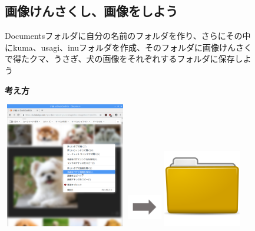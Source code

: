 \documentclass[a4paper,12pt]{jarticle}
\begin{document}
\begin{figure}[t]
  \subsection{\theExercise 
    画像けんさくし、画像をしよう}
  Documentsフォルダに自分の名前のフォルダを作り、さらにその中にkuma、usagi、inuフォルダを作成、そのフォルダに画像けんさくで得たクマ、うさぎ、犬の画像をそれぞれするフォルダに保存しよう

  \textbf{考え方}


  \bigskip




  \centering
  \begin{minipage}{\textwidth}
    \begin{minipage}{5.582cm}
      \includegraphics[width=5.413cm,height=5.461cm]{textbook-img092.png}
    \end{minipage}
    \begin{minipage}{3.582cm}
      \includegraphics[width=1.505cm,height=1.707cm]{textbook-img073.png}
    \end{minipage}
    \begin{minipage}{5.582cm}
      \includegraphics[width=3.387cm,height=3.387cm]{textbook-img044.png}
    \end{minipage}
  \end{minipage}



\end{figure}
\end{document}
